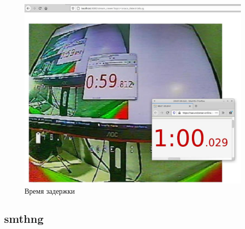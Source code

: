 \begin{figure}[H]
	\centering
	\includegraphics[width=0.5\linewidth]{pics/time}
	\caption{Время задержки%
	}
	\label{fig:time}
\end{figure}
\subsection{smthng}
